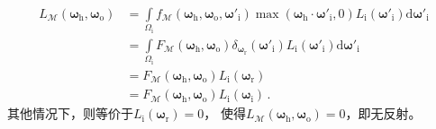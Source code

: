 \begin{align}\label{eq:08ex01-FresnelBRDFValid}
    L_{\mathcal{M}}({\bm\omega}_{\mathrm{h}},{\bm\omega}_{\mathrm{o}})
     & =\int\limits_{{\varOmega}_{\mathrm{i}}}f_{\mathcal{M}}({\bm\omega}_{\mathrm{h}},{\bm\omega}_{\mathrm{o}},{\bm\omega}'_{\mathrm{i}})
    \max({\bm\omega}_{\mathrm{h}}\cdot{\bm\omega}'_{\mathrm{i}},0)
    L_{\mathrm{i}}({\bm\omega}'_{\mathrm{i}})\mathrm{d}{\bm\omega}'_{\mathrm{i}}\nonumber                                                  \\
     & =\int\limits_{{\varOmega}_{\mathrm{i}}}F_{\mathcal{M}}({\bm\omega}_{\mathrm{h}},{\bm\omega}_{\mathrm{o}})
    \delta_{{\bm\omega}_{\mathrm{r}}}({\bm\omega}'_{\mathrm{i}})
    L_{\mathrm{i}}({\bm\omega}'_{\mathrm{i}})\mathrm{d}{\bm\omega}'_{\mathrm{i}}\nonumber                                                  \\
     & =F_{\mathcal{M}}({\bm\omega}_{\mathrm{h}},{\bm\omega}_{\mathrm{o}})L_{\mathrm{i}}({\bm\omega}_{\mathrm{r}})\nonumber                \\
     & =F_{\mathcal{M}}({\bm\omega}_{\mathrm{h}},{\bm\omega}_{\mathrm{o}})L_{\mathrm{i}}({\bm\omega}_{\mathrm{i}})\, .
\end{align}
其他情况下，则等价于$L_{\mathrm{i}}({\bm\omega}_{\mathrm{r}})=0$，
使得$L_{\mathcal{M}}({\bm\omega}_{\mathrm{h}},{\bm\omega}_{\mathrm{o}})=0$，即无反射。

